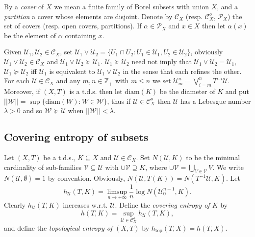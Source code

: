 \documentclass[12pt]{amsart}
\theoremstyle{definition} \theoremstyle{question}
\numberwithin{equation}{section}
\begin{document}
By a {\it cover} of $X$ we mean a finite family of Borel subsets
with union $X$, and a {\it partition} a cover whose elements are
disjoint. Denote by $\mathcal{C}_X$ (resp. $\mathcal{C}^o_X$,
$\mathcal{P}_X$) the set of covers (resp. open covers, partitions).
If $\alpha\in \mathcal{P}_X$ and $x\in X$ then let $\alpha (x)$ be
the element of $\alpha$ containing $x$.

Given $\mathcal{U}_1, \mathcal{U}_2\in \mathcal{C}_X$, set
$\mathcal{U}_1\vee \mathcal{U}_2= \{U_1\cap U_2: U_1\in
\mathcal{U}_1, U_2\in \mathcal{U}_2\}$, obviously $\mathcal{U}_1\vee
\mathcal{U}_2\in \mathcal{C}_X$ and $\mathcal{U}_1\vee
\mathcal{U}_2\succeq \mathcal{U}_1$. $\mathcal{U}_1\succeq
\mathcal{U}_2$ need not imply that $\mathcal{U}_1\vee \mathcal{U}_2=
\mathcal{U}_1$, $\mathcal{U}_1\succeq \mathcal{U}_2$ iff
$\mathcal{U}_1$ is equivalent to $\mathcal{U}_1\vee \mathcal{U}_2$
in the sense that each refines the other. For each $\mathcal{U}\in
\mathcal{C}_X$ and any $m, n\in \mathbb{Z}_+$ with $m\le n$ we set
$\mathcal{U}_m^n= \bigvee_{i= m}^n T^{- i} \mathcal{U}$. Moreover,
if $(X, T)$ is a t.d.s. then let $\text{diam} (K)$ be the diameter
of $K$ and put $||\mathcal{W}||= \sup \{\text{diam} (W): W\in
\mathcal{W}\}$, thus if $\mathcal{U}\in \mathcal{C}^o_X$ then
$\mathcal{U}$ has a Lebesgue number $\lambda> 0$ and so
$\mathcal{W}\succeq \mathcal{U}$ when $||\mathcal{W}||< \lambda$.

\subsection{Covering entropy of subsets}

Let $(X, T)$ be a  t.d.s., $K\subseteq X$ and $\mathcal{U}\in
\mathcal{C}_X$. Set $N (\mathcal{U}, K)$ to be the minimal
cardinality of sub-families $\mathcal{V}\subseteq \mathcal{U}$ with
$\cup \mathcal{V}\supseteq K$, where $\cup \mathcal{V}=
\bigcup_{V\in \mathcal{V}}V$. We write $N(\mathcal{U}, \emptyset)=
1$ by convention. Obviously, $N (\mathcal{U}, T (K))= N (T^{- 1}
\mathcal{U}, K)$. Let
\begin{equation*}
h_\mathcal{U} (T, K)= \limsup_{n\rightarrow +\infty} \frac{1}{n}
\log N (\mathcal{U}_0^{n- 1}, K).
\end{equation*}
Clearly $h_\mathcal{U} (T, K)$ increases w.r.t. $\mathcal{U}$.
Define the {\it covering entropy of $K$} by
$$h (T, K)= \sup_{\mathcal{U}\in \mathcal{C}^o_X} h_\mathcal{U} (T, K),$$
and define the {\it topological entropy of $(X, T)$} by
$h_{\text{top}} (T, X)= h (T, X)$.
\end{document}
